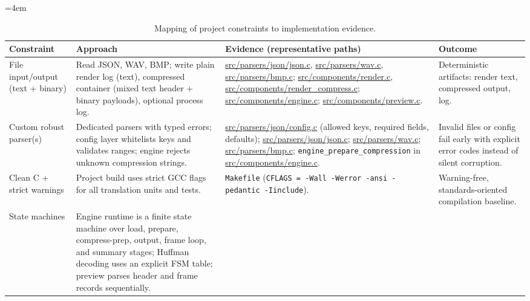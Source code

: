 \begin{table}[H]
    \centering
    \footnotesize
    \caption{Mapping of project constraints to implementation evidence.}
    \label{tab:constraint_evidence}
    \begingroup
    \sloppy
    \emergencystretch=4em\relax
    \begin{tabularx}{\textwidth}{@{} >{\raggedright\arraybackslash}p{2.2cm} >{\raggedright\arraybackslash\hsize=0.85\hsize}X >{\raggedright\arraybackslash\hsize=1.35\hsize}X >{\raggedright\arraybackslash\hsize=0.80\hsize}X @{}}
        \toprule
        \textbf{Constraint} & \textbf{Approach} & \textbf{Evidence (representative paths)} & \textbf{Outcome} \\
        \midrule
        File input/output (text + binary) &
        Read JSON, WAV, BMP; write plain render log (text), compressed container (mixed text header + binary payloads), optional process log. &
        \url{src/parsers/json/json.c}, \url{src/parsers/wav.c}, \url{src/parsers/bmp.c}; \url{src/components/render.c}, \url{src/components/render_compress.c}; \url{src/components/engine.c}; \url{src/components/preview.c}. &
        Deterministic artifacts: render text, compressed output, log. \\
        \addlinespace
        Custom robust parser(s) &
        Dedicated parsers with typed errors; config layer whitelists keys and validates ranges; engine rejects unknown compression strings. &
        \url{src/parsers/json/config.c} (allowed keys, required fields, defaults); \url{src/parsers/json/json.c}; \url{src/parsers/wav.c}; \url{src/parsers/bmp.c}; \texttt{engine\_prepare\_compression} in \url{src/components/engine.c}. &
        Invalid files or config fail early with explicit error codes instead of silent corruption. \\
        \addlinespace
        Clean C + strict warnings &
        Project build uses strict GCC flags for all translation units and tests. &
        \texttt{Makefile} (\texttt{CFLAGS = -Wall -Werror -ansi -pedantic -Iinclude}). &
        Warning-free, standards-oriented compilation baseline. \\
        \addlinespace
        State machines &
        Engine runtime is a finite state machine over load, prepare, compress-prep, output, frame loop, and summary stages; Huffman decoding uses an explicit FSM table; preview parses header and frame records sequentially. &

\end{tabularx}
\end{table}
